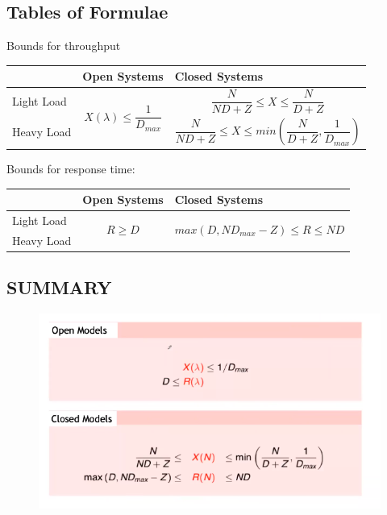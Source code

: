 \documentclass{article}
\begin{document}
			\subsection{Tables of Formulae}
				Bounds for throughput
				\begin{longtable}{ m{} | m{0.45\textwidth} | m{} |}
					& Open Systems & Closed Systems \\
					\hline
					Light Load & \multirow{2}{0.3\textwidth}{ 
						\begin{equation}
							X(\lambda) \leq \frac{1}{D_{max}}
						\end{equation}
					} &  
						\begin{equation}
							\frac{N}{ND + Z} \leq X \leq \frac{N}{D + Z}
						\end{equation}
					\\
					Heavy Load & & 
						\begin{equation}
							\frac{N}{ND + Z} \leq X \leq min(\frac{N}{D + Z}, \frac{1}{D_{max}})
						\end{equation}
					\\
					\hline					
				\end{longtable}
				Bounds for response time:
				\begin{longtable}{ m{} | m{} | m{} |}
					& Open Systems & Closed Systems \\
					\hline
					Light Load & \multirow{2}{0.3\textwidth}{ 
						\begin{equation}
							R \geq D
						\end{equation}
					} & \multirow{2}{0.3\textwidth}{
						\begin{equation}
							max(D, ND_{max}-Z) \leq R \leq ND
						\end{equation}
					}
					\\
					Heavy Load & & \\
					\hline					
				\end{longtable}

			\subsection{SUMMARY}	
				\begin{figure}[H]
					\centering
					\includegraphics[width = \textwidth]{./images/superSummary2.png}
				\end{figure}
				
\end{document}
